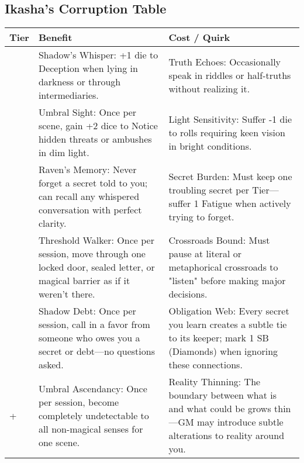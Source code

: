 \subsection*{Ikasha's Corruption Table}
\label{sec:ikasha-corruption}

\begin{longtable}{>{\raggedright\arraybackslash}p{1cm} p{5cm} p{5cm}}
\toprule
\textbf{Tier} & \textbf{Benefit} & \textbf{Cost / Quirk} \\
\midrule
1 & Shadow's Whisper: +1 die to Deception when lying in darkness or through intermediaries. & Truth Echoes: Occasionally speak in riddles or half-truths without realizing it. \\
\midrule
2 & Umbral Sight: Once per scene, gain +2 dice to Notice hidden threats or ambushes in dim light. & Light Sensitivity: Suffer -1 die to rolls requiring keen vision in bright conditions. \\
\midrule
3 & Raven's Memory: Never forget a secret told to you; can recall any whispered conversation with perfect clarity. & Secret Burden: Must keep one troubling secret per Tier—suffer 1 Fatigue when actively trying to forget. \\
\midrule
4 & Threshold Walker: Once per session, move through one locked door, sealed letter, or magical barrier as if it weren't there. & Crossroads Bound: Must pause at literal or metaphorical crossroads to "listen" before making major decisions. \\
\midrule
5 & Shadow Debt: Once per session, call in a favor from someone who owes you a secret or debt—no questions asked. & Obligation Web: Every secret you learn creates a subtle tie to its keeper; mark 1 SB (Diamonds) when ignoring these connections. \\
\midrule
6+ & Umbral Ascendancy: Once per session, become completely undetectable to all non-magical senses for one scene. & Reality Thinning: The boundary between what is and what could be grows thin—GM may introduce subtle alterations to reality around you. \\
\bottomrule
\end{longtable}